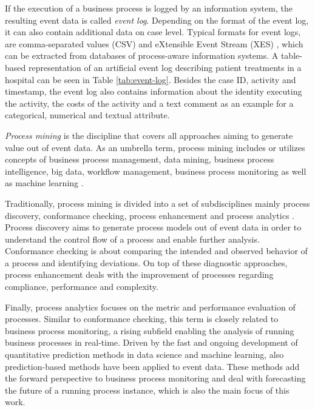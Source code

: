 If the execution of a business process is logged by an information system, the resulting event data is called \textit{event log}.
Depending on the format of the event log, it can also contain additional data on case level.
Typical formats for event logs, are comma-separated values (CSV) and eXtensible Event Stream (XES) \cite{DBLP:conf/caise/VerbeekBDA10a}, which can be extracted from databases of process-aware information systems.
A table-based representation of an artificial event log describing patient treatments in a hospital can be seen in Table \ref{tab:event-log}.
Besides the case ID, activity and timestamp, the event log also contains information about the identity executing the activity, the costs of the activity and a text comment as an example for a categorical, numerical and textual attribute.

\begin{definition}
	\textit{Process mining} is the discipline that covers all approaches aiming to generate value out of event data.
	As an umbrella term, process mining includes or utilizes concepts of business process management, data mining, business process intelligence, big data, workflow management, business process monitoring \cite{DBLP:books/sp/Aalst16} as well as machine learning \cite{DBLP:conf/bpm/VeitGMHT17}.
\end{definition}

Traditionally, process mining is divided into a set of subdisciplines mainly process discovery, conformance checking, process enhancement and process analytics \cite{DBLP:conf/caise/EckLLA15}.
Process discovery aims to generate process models out of event data in order to understand the control flow of a process and enable further analysis.
Conformance checking is about comparing the intended and observed behavior of a process and identifying deviations.
On top of these diagnostic approaches, process enhancement deals with the improvement of processes regarding compliance, performance and complexity.

Finally, process analytics focuses on the metric and performance evaluation of processes. Similar to conformance checking, this term is closely related to business process monitoring, a rising subfield enabling the analysis of running business processes in real-time.
Driven by the fast and ongoing development of quantitative prediction methods in data science and machine learning, also prediction-based methods have been applied to event data.
These methods add the forward perspective to business process monitoring and deal with forecasting the future of a running process instance, which is also the main focus of this work.


